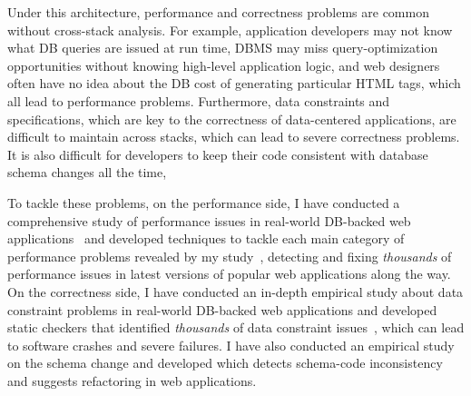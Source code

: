 Under this architecture, performance and correctness problems are common without cross-stack analysis. For example, application developers
may not know what DB queries are issued at run time, DBMS may miss query-optimization opportunities without knowing high-level application logic, and
web designers often have no idea about the DB cost of generating particular HTML tags, which all lead to performance problems. Furthermore, data constraints
and specifications, which are key to the correctness of data-centered applications, are difficult to maintain across stacks, which can lead to severe correctness problems. It is also difficult for developers to keep their code 
consistent with database schema changes all the time,

To tackle these problems, on the performance side, I have conducted a comprehensive study of performance issues in real-world DB-backed web applications~\cite{yang2018not} and developed techniques to tackle each main category of performance problems revealed by my study~\cite{yang:fse18:powerstation,yang2019panorama}, detecting and fixing \textit{thousands} of performance issues in 
latest versions of popular web applications along the way. On the correctness side, I have conducted an in-depth empirical study about data constraint problems in
real-world DB-backed web applications and developed static checkers that identified \textit{thousands} of data constraint issues~\cite{yang2020managing}, which can lead to software crashes and severe failures. I have also conducted an empirical study on the schema change and developed  \ETool{} which detects 
schema-code inconsistency and suggests refactoring in
web applications. 
